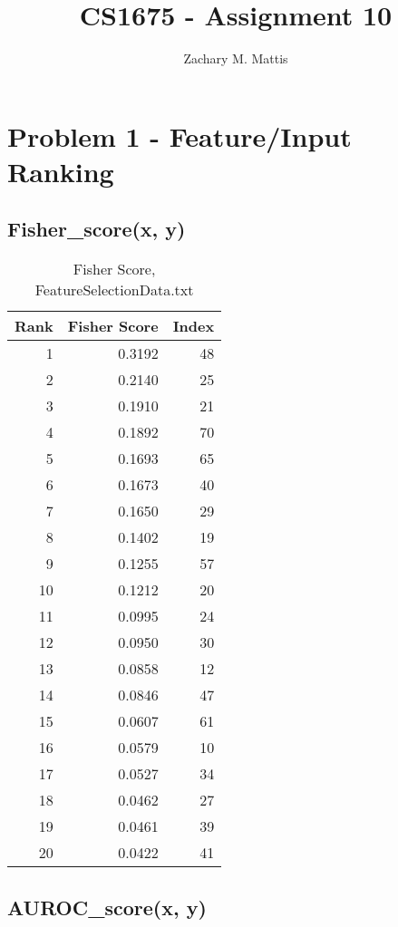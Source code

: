 \documentclass[12pt, letterpaper]{report}
\title{CS1675 - Assignment 10}
\author{Zachary M. Mattis}
\begin{document}
\maketitle

\section{Problem 1 - Feature/Input Ranking}


\subsection{Fisher\_score(x, y)}

\begin{table}[H]
	\centering
	\begin{tabular}{ |r|r|r| }
		\hline
		\textbf{Rank} & \textbf{Fisher Score} & \textbf{Index} \\
		\hline
		1 & 0.3192 & 48 \\
		\hline
		2 & 0.2140 & 25 \\
		\hline
		3 & 0.1910 & 21 \\
		\hline
		4 & 0.1892 & 70 \\
		\hline
		5 & 0.1693 & 65 \\
		\hline		
		6 & 0.1673 & 40 \\
		\hline
		7 & 0.1650 & 29 \\
		\hline
		8 & 0.1402 & 19 \\
		\hline
		9 & 0.1255 & 57 \\
		\hline
		10 & 0.1212 & 20 \\
		\hline
		11 & 0.0995 & 24 \\
		\hline
		12 & 0.0950 & 30 \\
		\hline
		13 & 0.0858 & 12 \\
		\hline
		14 & 0.0846 & 47 \\
		\hline
		15 & 0.0607 & 61 \\
		\hline
		16 & 0.0579 & 10 \\
		\hline
		17 & 0.0527 & 34 \\
		\hline
		18 & 0.0462 & 27 \\
		\hline
		19 & 0.0461 & 39 \\
		\hline
		20 & 0.0422 & 41 \\
		\hline
	\end{tabular}
	\caption{Fisher Score, FeatureSelectionData.txt}
\end{table}


\subsection{AUROC\_score(x, y)}
\end{document}

